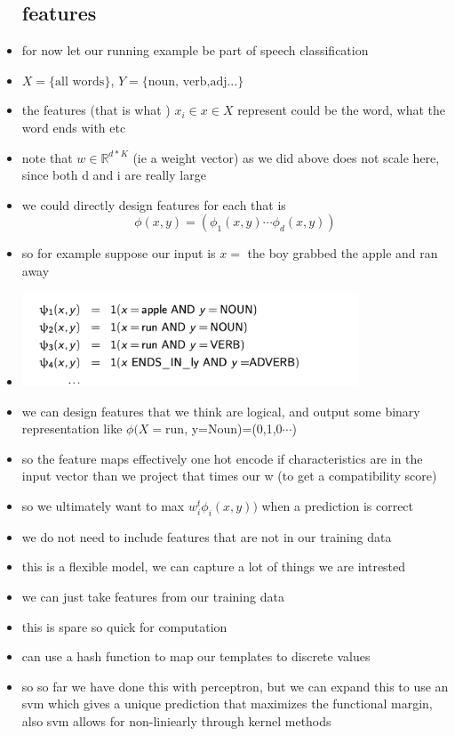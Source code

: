 \documentclass{article}
\begin{document}
\begin{itemize}
\subsection*{features }
\item for now let our running example be part of speech classification
\item $X=\{\text{all words}\}$, $Y=\{\text{noun, verb,adj...}\}$
\item the features (that is what ) $x_i\in x\in X$ represent could be the word, what the word ends with etc 
\item note that  $w\in\mathbb{R}^{d*K}$ (ie a weight vector) as we did above does not scale here, since both d and i are really large 
\item we could directly design features for each that is $$\phi(x,y)=(\phi_1(x,y)\cdots \phi_{d}(x,y))$$ 
\item so for example suppose our input is $x=$ the boy grabbed the apple and ran away
\item \includegraphics*[width=10cm]{images/Screenshot 2023-05-14 at 4.23.43 PM.png}
\item we can design features that we think are logical, and output some binary representation like $\phi(X=$run, y=Noun)=(0,1,0$\cdots$)
\item so the feature maps effectively one hot encode if characteristics are in the input vector than we project that times our w (to get a compatibility score)
\item so we ultimately want to max $w_{i}^{t}\phi_{i}(x,y))$  when a prediction is correct
\item we do not need to include features that are not in our training data 
\item this is a flexible model, we can capture a lot of things we are intrested 
\item we can just take features from our training data 
\item this is spare so quick for computation 
\item can use a hash function to map our templates to discrete values 
\item so so far we have done this with perceptron, but we can expand this to use an svm which gives a unique prediction that maximizes the functional margin, also svm allows for non-liniearly through kernel methods 

\end{itemize}
\end{document}
